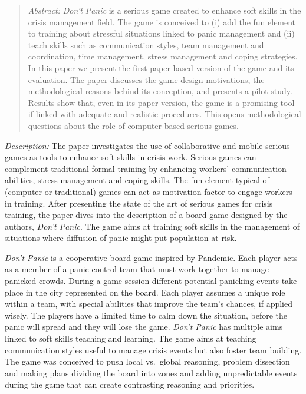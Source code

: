 \begin{quote}
\emph{Abstract:} \emph{Don't Panic} is a serious game created to enhance
soft skills in the crisis management field. The game is conceived to (i)
add the fun element to training about stressful situations linked to
panic management and (ii) teach skills such as communication styles,
team management and coordination, time management, stress management and
coping strategies. In this paper we present the first paper-based
version of the game and its evaluation. The paper discusses the game
design motivations, the methodological reasons behind its conception,
and presents a pilot study. Results show that, even in its paper
version, the game is a promising tool if linked with adequate and
realistic procedures. This opens methodological questions about the role
of computer based serious games.
\end{quote}

\emph{Description:} The paper investigates the use of collaborative and
mobile serious games as tools to enhance soft skills in crisis work.
Serious games can complement traditional formal training by enhancing
workers' communication abilities, stress management and coping skills.
The fun element typical of (computer or traditional) games can act as
motivation factor to engage workers in training. After presenting the
state of the art of serious games for crisis training, the paper dives
into the description of a board game designed by the authors,
\emph{Don't Panic}. The game aims at training soft skills in the
management of situations where diffusion of panic might put population
at risk.

\emph{Don't Panic} is a cooperative board game inspired by Pandemic.
Each player acts as a member of a panic control team that must work
together to manage panicked crowds. During a game session different
potential panicking events take place in the city represented on the
board. Each player assumes a unique role within a team, with special
abilities that improve the team's chances, if applied wisely. The
players have a limited time to calm down the situation, before the panic
will spread and they will lose the game. \emph{Don't Panic} has multiple
aims linked to soft skills teaching and learning. The game aims at
teaching communication styles useful to manage crisis events but also
foster team building. The game was conceived to push local vs.~global
reasoning, problem dissection and making plans dividing the board into
zones and adding unpredictable events during the game that can create
contrasting reasoning and priorities.

